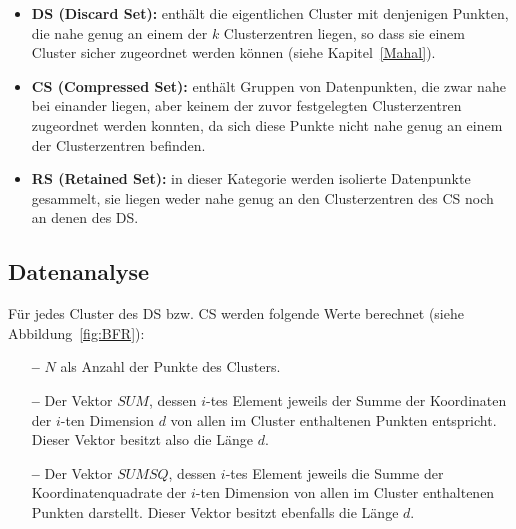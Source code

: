 \documentclass[a4paper,12pt,twoside]{article}
\begin{document}
\begin{itemize}
	\item \textbf{DS (Discard Set):} enthält die eigentlichen Cluster mit denjenigen Punkten, die nahe genug an einem der $ k $ Clusterzentren liegen, so dass sie einem Cluster sicher zugeordnet werden können (siehe Kapitel~\ref{Mahal}).
	
	\item \textbf{CS (Compressed Set):} enthält Gruppen von Datenpunkten, die zwar nahe bei einander liegen, aber keinem der zuvor festgelegten Clusterzentren zugeordnet werden konnten, da sich diese Punkte nicht nahe genug an einem der Clusterzentren befinden.
	
	\item \textbf{RS (Retained Set):} in dieser Kategorie werden isolierte Datenpunkte gesammelt, sie liegen weder nahe genug an den Clusterzentren des CS noch an denen des DS.
	
\end{itemize}

\subsection{Datenanalyse} 

Für jedes Cluster des DS bzw. CS werden folgende Werte berechnet (siehe Abbildung~\ref{fig:BFR}):

\begin{itemize}
	\item[\textbf{--}] $ N $ als Anzahl der Punkte des Clusters.
	\item[\textbf{--}] Der Vektor $ SUM $, dessen $ i $-tes Element jeweils der Summe der Koordinaten der $ i $-ten Dimension $ d $ von allen im Cluster enthaltenen Punkten entspricht. Dieser Vektor besitzt also die Länge $ d $.
	\item[\textbf{--}] Der Vektor $ SUMSQ $, dessen $ i $-tes Element jeweils die Summe der Koordinatenquadrate der $ i $-ten Dimension von allen im Cluster enthaltenen Punkten darstellt. Dieser Vektor besitzt ebenfalls die Länge $ d $.
\end{itemize}
\end{document}
